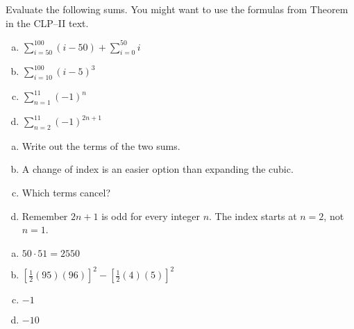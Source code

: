 \begin{question}\label{1.1sigmab}
Evaluate the following sums. You might want to use the formulas from Theorem~ in the CLP--II text.
\begin{enumerate}[(a)]
\item $\displaystyle\sum_{i=50}^{100} (i-50)+\displaystyle\sum_{i=0}^{50} i$
\item $\displaystyle\sum_{i=10}^{100} \left(i-5\right)^3$
\item $\displaystyle\sum_{n=1}^{11} (-1)^n$
\item $\displaystyle\sum_{n=2}^{11} (-1)^{2n+1}$
\end{enumerate}
\end{question}
\begin{hint}
\begin{enumerate}[(a)]
\item Write out the terms of the two sums.
\item A change of index is an easier option than expanding the cubic.
\item Which terms cancel?
\item Remember $2n+1$ is odd for every integer $n$. The index starts at $n=2$, not $n=1$.
\end{enumerate}
\end{hint}
\begin{answer}
\begin{enumerate}[(a)]
\item $50\cdot 51=2550$
\item $\left[\frac{1}{2}(95)(96)\right]^2-\left[\frac{1}{2}(4)(5)\right]^2$
\item $-1$
\item $-10$
\end{enumerate}
\end{answer}
